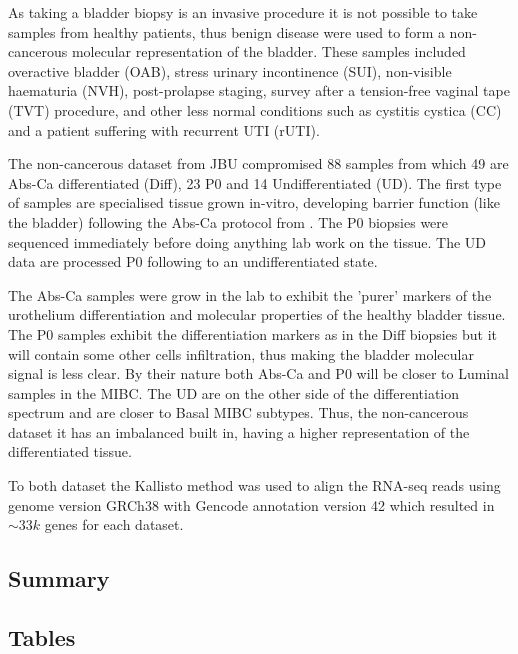 As taking a bladder biopsy is an invasive procedure it is not possible to take samples from healthy patients, thus benign disease were used to form a non-cancerous molecular representation of the bladder. These samples included overactive bladder (OAB), stress urinary incontinence (SUI), non-visible haematuria (NVH), post-prolapse staging, survey after a tension-free vaginal tape (TVT) procedure, and other less normal conditions such as cystitis cystica (CC) and a patient suffering with recurrent UTI (rUTI).

The non-cancerous dataset from JBU compromised 88 samples from which 49 are Abs-Ca differentiated (Diff), 23 P0 and 14 Undifferentiated (UD). The first type of samples are specialised tissue grown in-vitro, developing barrier function (like the bladder) following the Abs-Ca protocol from \cite{Cross2005-fe}. The P0 biopsies were sequenced immediately before doing anything lab work on the tissue. The UD data are processed P0 following \cite{Cross2005-fe} to an undifferentiated state. 

The Abs-Ca samples were grow in the lab to exhibit the 'purer' markers of the urothelium differentiation and molecular properties of the healthy bladder tissue. The P0 samples exhibit the differentiation markers as in the Diff biopsies but it will contain some other cells infiltration, thus making the bladder molecular signal is less clear. By their nature both Abs-Ca and P0 will be closer to Luminal samples in the MIBC. The UD are on the other side of the differentiation spectrum and are closer to Basal MIBC subtypes. Thus, the non-cancerous dataset it has an imbalanced built in, having a higher representation of the differentiated tissue. 

To both dataset the Kallisto method was used to align the RNA-seq reads using genome version GRCh38 with Gencode annotation version 42 which resulted in $\sim33k$ genes for each dataset.


\subsection{Summary}


\pagebreak

\subsection{Tables}


